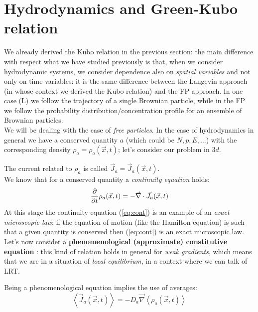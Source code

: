 \documentclass[\main/main.tex]{subfiles}
\begin{document}
\section{Hydrodynamics and Green-Kubo relation}
We already derived the Kubo relation in the previous section: the main difference with respect what we have studied previously is that, when we consider hydrodynamic systems, we consider dependence also on \textit{spatial variables} and not only on time variables: it is the same difference between the Langevin approach (in whose context we derived the Kubo relation) and the FP approach.
In one case (L) we follow the trajectory of a single Brownian particle, while in the FP we follow the probability distribution/concentration profile for an ensemble of Brownian particles. \\

We will be dealing with the case of \textit{free particles}. In the case of hydrodynamics in general we have a conserved quantity $a$ (which could be $N,p,E,\dots$) with the corresponding density $\rho_a=\rho_a(\Vec{x},t)$; let's consider our problem in $3d$.

The current related to $\rho_a$ is called $\Vec{J}_a=\Vec{J}_a(\Vec{x},t)$. \\

We know that for a conserved quantity a \textit{continuity equation} holds:
\begin{equation}
    \frac{\partial}{\partial t}\rho_a(\Vec{x},t)=-\Vec{\nabla}\cdot \Vec{J}_a(\Vec{x},t)
    \label{eq:cont}
\end{equation}
At this stage the continuity equation (\ref{eq:cont}) is an example of an \textit{exact microscopic law}: if the equation of motion (like the Hamilton equation) is such that a given quantity is conserved then (\ref{eq:cont}) is an exact microscopic law. \\

Let's now consider a \textbf{phenomenological (approximate) constitutive equation }: this kind of relation holds in general for \textit{weak gradients}, which means that we are in a situation of \textit{local equilibrium}, in a context where we can talk of LRT.

Being a phenomenological equation implies the use of averages:
\begin{equation}
    \left\langle\Vec{J}_{a}(\vec{x}, t)\right\rangle=-D_{a} \vec{\nabla}\left\langle\rho_{a}(\vec{x}, t)\right\rangle
    \label{eq:fl}
\end{equation}
\end{document}
